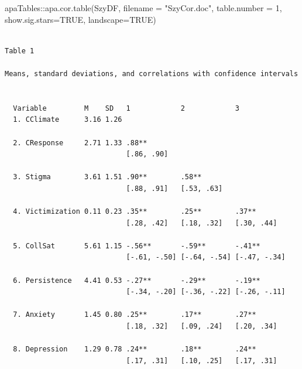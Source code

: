 \documentclass[
  english,
]{book}
\newenvironment{Shaded}{\begin{snugshade}}{\end{snugshade}}
\newcommand{\AttributeTok}[1]{\textcolor[rgb]{0.77,0.63,0.00}{#1}}
\newcommand{\ConstantTok}[1]{\textcolor[rgb]{0.00,0.00,0.00}{#1}}
\newcommand{\DecValTok}[1]{\textcolor[rgb]{0.00,0.00,0.81}{#1}}
\newcommand{\FunctionTok}[1]{\textcolor[rgb]{0.00,0.00,0.00}{#1}}
\newcommand{\NormalTok}[1]{#1}
\newcommand{\SpecialCharTok}[1]{\textcolor[rgb]{0.00,0.00,0.00}{#1}}
\newcommand{\StringTok}[1]{\textcolor[rgb]{0.31,0.60,0.02}{#1}}
\begin{document}
\begin{Shaded}
\begin{Highlighting}[]
\NormalTok{apaTables}\SpecialCharTok{::}\FunctionTok{apa.cor.table}\NormalTok{(SzyDF, }\AttributeTok{filename =} \StringTok{"SzyCor.doc"}\NormalTok{, }\AttributeTok{table.number =} \DecValTok{1}\NormalTok{, }\AttributeTok{show.sig.stars=}\ConstantTok{TRUE}\NormalTok{, }\AttributeTok{landscape=}\ConstantTok{TRUE}\NormalTok{)}
\end{Highlighting}
\end{Shaded}

\begin{verbatim}

Table 1 

Means, standard deviations, and correlations with confidence intervals
 

  Variable         M    SD   1            2            3           
  1. CClimate      3.16 1.26                                       
                                                                   
  2. CResponse     2.71 1.33 .88**                                 
                             [.86, .90]                            
                                                                   
  3. Stigma        3.61 1.51 .90**        .58**                    
                             [.88, .91]   [.53, .63]               
                                                                   
  4. Victimization 0.11 0.23 .35**        .25**        .37**       
                             [.28, .42]   [.18, .32]   [.30, .44]  
                                                                   
  5. CollSat       5.61 1.15 -.56**       -.59**       -.41**      
                             [-.61, -.50] [-.64, -.54] [-.47, -.34]
                                                                   
  6. Persistence   4.41 0.53 -.27**       -.29**       -.19**      
                             [-.34, -.20] [-.36, -.22] [-.26, -.11]
                                                                   
  7. Anxiety       1.45 0.80 .25**        .17**        .27**       
                             [.18, .32]   [.09, .24]   [.20, .34]  
                                                                   
  8. Depression    1.29 0.78 .24**        .18**        .24**       
                             [.17, .31]   [.10, .25]   [.17, .31]  
                                                                   

\end{verbatim}
\end{document}
